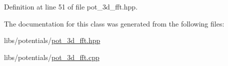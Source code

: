 Definition at line 51 of file pot\-\_\-3d\-\_\-fft.\-hpp.



The documentation for this class was generated from the following files\-:\begin{DoxyCompactItemize}
\item 
libs/potentials/\hyperlink{pot__3d__fft_8hpp}{pot\-\_\-3d\-\_\-fft.\-hpp}\item 
libs/potentials/\hyperlink{pot__3d__fft_8cpp}{pot\-\_\-3d\-\_\-fft.\-cpp}\end{DoxyCompactItemize}
